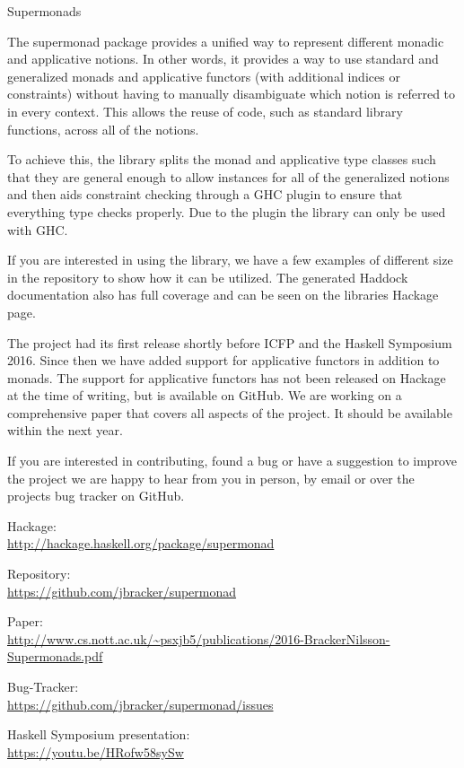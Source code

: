 \begin{hcarentry}{Supermonads}
\makeheader

The supermonad package provides a unified way to represent different monadic
and applicative notions. In other words, it provides a way to use standard and generalized
monads and applicative functors (with additional indices or constraints)
without having to manually disambiguate which notion is referred to in every context.
This allows the reuse of code, such as standard library functions, across all of 
the notions.

To achieve this, the library splits the monad and applicative type classes
such that they are general enough to allow instances for all of the generalized notions and
then aids constraint checking through a GHC plugin to ensure that everything
type checks properly. Due to the plugin the library can only be used with GHC.

If you are interested in using the library, we have a few examples of
different size in the repository to show how it can be utilized. The generated
Haddock documentation also has full coverage and can be seen on the libraries
Hackage page.

The project had its first release shortly before ICFP and the Haskell
Symposium 2016. Since then we have added support for applicative 
functors in addition to monads. The support for applicative 
functors has not been released on Hackage at the time of writing, 
but is available on GitHub.
We are working on a comprehensive paper that covers all aspects of the project.
It should be available within the next year.

If you are interested in contributing, found a bug or have a suggestion to
improve the project we are happy to hear from you in person, by email or over
the projects bug tracker on GitHub.

\FurtherReading
\begin{compactitem}
  \item Hackage:\\ \url{http://hackage.haskell.org/package/supermonad}
  \item Repository:\\ \url{https://github.com/jbracker/supermonad}
  \item Paper:\\
    \url{http://www.cs.nott.ac.uk/~psxjb5/publications/2016-BrackerNilsson-Supermonads.pdf}
  \item Bug-Tracker:\\ \url{https://github.com/jbracker/supermonad/issues}
  \item Haskell Symposium presentation:\\ \url{https://youtu.be/HRofw58sySw}
\end{compactitem}
\end{hcarentry}
